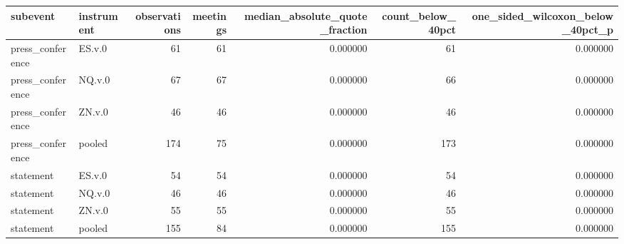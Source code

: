 \begin{tabular}{llrrrrr}
\toprule
subevent & instrument & observations & meetings & median_absolute_quote_fraction & count_below_40pct & one_sided_wilcoxon_below_40pct_p \\
\midrule
press_conference & ES.v.0 & 61 & 61 & 0.000000 & 61 & 0.000000 \\
press_conference & NQ.v.0 & 67 & 67 & 0.000000 & 66 & 0.000000 \\
press_conference & ZN.v.0 & 46 & 46 & 0.000000 & 46 & 0.000000 \\
press_conference & pooled & 174 & 75 & 0.000000 & 173 & 0.000000 \\
statement & ES.v.0 & 54 & 54 & 0.000000 & 54 & 0.000000 \\
statement & NQ.v.0 & 46 & 46 & 0.000000 & 46 & 0.000000 \\
statement & ZN.v.0 & 55 & 55 & 0.000000 & 55 & 0.000000 \\
statement & pooled & 155 & 84 & 0.000000 & 155 & 0.000000 \\
\bottomrule
\end{tabular}
